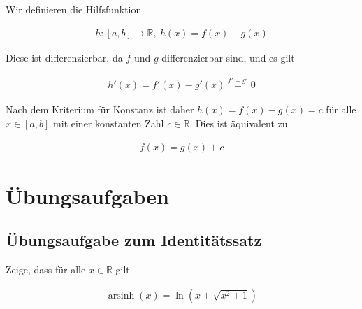 \documentclass[fontsize=9pt,
               parskip=half-,
               DIV=14,
               listof=chapterentry,
               tocflat]{scrbook}
\begin{document}
\begin{proof*}[Identitätssatz]
Wir definieren die Hilfsfunktion

\begin{align*}
h:[a,b]\to \mathbb {R} ,\ h(x)=f(x)-g(x)
\end{align*}

Diese ist differenzierbar, da $f$ und $g$ differenzierbar sind, und es gilt

\begin{align*}
h'(x)=f'(x)-g'(x){\overset {f'=g'}{=}}0
\end{align*}

Nach dem Kriterium für Konstanz ist daher $h(x)=f(x)-g(x)=c$ für alle $x\in [a,b]$ mit einer konstanten Zahl $c\in \mathbb {R} $. Dies ist äquivalent zu

\begin{align*}
f(x)=g(x)+c
\end{align*}

\end{proof*}

\section{Übungsaufgaben}

\subsection{Übungsaufgabe zum Identitätssatz}

\begin{exercise*}
Zeige, dass für alle $x\in \mathbb {R} $ gilt

\begin{align*}
\operatorname {arsinh} (x)=\ln \left(x+{\sqrt {x^{2}+1}}\right)
\end{align*}

\end{exercise*}
\end{document}
